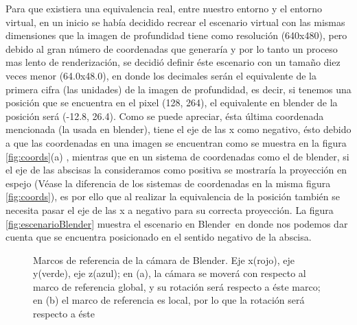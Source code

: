 \documentclass[a4paper,openright,12pt]{report}
\begin{document}
Para que existiera una equivalencia real, entre nuestro entorno y el entorno virtual, en un inicio se había decidido recrear el escenario virtual con las mismas dimensiones que la imagen de profundidad tiene como resolución (640x480), pero debido al gran número de coordenadas que generaría y por lo tanto un proceso mas lento de renderización, se decidió definir éste escenario con un tamaño diez veces menor (64.0x48.0), en donde los decimales serán el equivalente de la primera cifra (las unidades) de la imagen de profundidad, es decir, si tenemos una posición que se encuentra en el pixel (128, 264), el equivalente en blender de la posición será (-12.8, 26.4). Como se puede apreciar, ésta última coordenada mencionada (la usada en blender), tiene el eje de las x como negativo, ésto debido a que las coordenadas en una imagen se encuentran como se muestra en la figura  \ref{fig:coords}(a) , mientras que en un sistema de coordenadas como el de blender, si el eje de las abscisas la consideramos como positiva se mostraría la proyección en espejo (Véase la diferencia de los sistemas de coordenadas en la misma figura \ref{fig:coords}), es por ello que al realizar la equivalencia de la posición también se necesita pasar el eje de las x a negativo para su correcta proyección. La figura \ref{fig:escenarioBlender} muestra el escenario en Blender\textcopyright\ en donde nos podemos dar cuenta que se encuentra posicionado en el sentido negativo de la abscisa.\\
\begin{figure}[p]
	\centering
	\hspace*{-5mm}
	\hspace*{-5mm}
	\caption[Marcos de referencia de la cámara de Blender]{Marcos de referencia de la cámara de Blender. Eje x(rojo), eje y(verde), eje z(azul); en (a), la cámara se moverá con respecto al marco de referencia global, y su rotación será respecto a éste marco; en (b) el marco de referencia es local, por lo que la rotación será respecto a éste} \label{fig:camaraBlender}
\end{figure}
\end{document}
